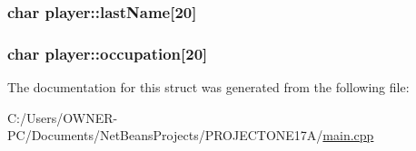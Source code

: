 \hypertarget{structplayer_a83c4f28c58a5b8bab702fbec9b453a08}{
\subsubsection[{last\+Name}]{\setlength{\rightskip}{0pt plus 5cm}char player\+::last\+Name\mbox{[}20\mbox{]}}}\label{structplayer_a83c4f28c58a5b8bab702fbec9b453a08}
\hypertarget{structplayer_ae14113611c63ca2782696f0048161f3b}{
\subsubsection[{occupation}]{\setlength{\rightskip}{0pt plus 5cm}char player\+::occupation\mbox{[}20\mbox{]}}}\label{structplayer_ae14113611c63ca2782696f0048161f3b}


The documentation for this struct was generated from the following file\+:\begin{DoxyCompactItemize}
\item 
C\+:/\+Users/\+O\+W\+N\+E\+R-\/\+P\+C/\+Documents/\+Net\+Beans\+Projects/\+P\+R\+O\+J\+E\+C\+T\+O\+N\+E17\+A/\hyperlink{main_8cpp}{main.\+cpp}\end{DoxyCompactItemize}
